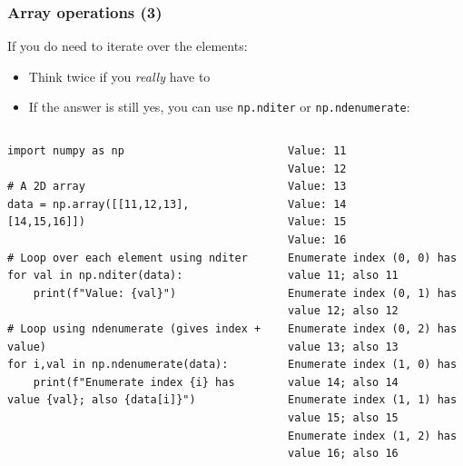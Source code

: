 \begin{frame}[fragile]
  \frametitle{Array operations (3)}
  If you do need to iterate over the elements:
  \begin{itemize}
    \item Think twice if you \emph{really} have to
    \item If the answer is still yes, you can use \lstinline|np.nditer| or \lstinline|np.ndenumerate|:
  \end{itemize}
  \pause
  \begin{columns}
    \begin{lstlisting}
import numpy as np 

# A 2D array
data = np.array([[11,12,13], [14,15,16]])

# Loop over each element using nditer
for val in np.nditer(data):
    print(f"Value: {val}")

# Loop using ndenumerate (gives index + value)
for i,val in np.ndenumerate(data):
    print(f"Enumerate index {i} has value {val}; also {data[i]}")
    \end{lstlisting}
    \begin{lstlisting}[style=PyOutput]
Value: 11
Value: 12
Value: 13
Value: 14
Value: 15
Value: 16
Enumerate index (0, 0) has value 11; also 11
Enumerate index (0, 1) has value 12; also 12
Enumerate index (0, 2) has value 13; also 13
Enumerate index (1, 0) has value 14; also 14
Enumerate index (1, 1) has value 15; also 15
Enumerate index (1, 2) has value 16; also 16
    \end{lstlisting}
  \end{columns}
\end{frame}

